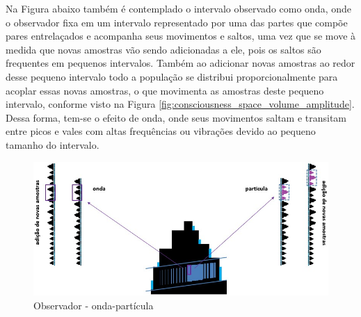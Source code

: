Na Figura abaixo também é contemplado o intervalo observado como onda, onde o observador fixa em um intervalo representado por uma das partes que compõe pares entrelaçados e acompanha seus movimentos e saltos, uma vez que se move à medida que novas amostras vão sendo adicionadas a ele, pois os saltos são frequentes em pequenos intervalos. Também ao adicionar novas amostras ao redor desse pequeno intervalo todo a população se distribui proporcionalmente para acoplar essas novas amostras, o que movimenta as amostras deste pequeno intervalo, conforme visto na Figura \ref{fig:consciousness_space_volume_amplitude}. Dessa forma, tem-se o efeito de onda, onde seus movimentos saltam e transitam entre picos e vales com altas frequências ou vibrações devido ao pequeno tamanho do intervalo.
	\begin{figure}[H]
	\caption{Observador - onda-partícula}
	\label{fig:consciousness_space_wave-particle}
	\centering
	\includegraphics[scale=.55]{sections/images/consciousness_space_wave-particle.jpg}
	\end{figure}
